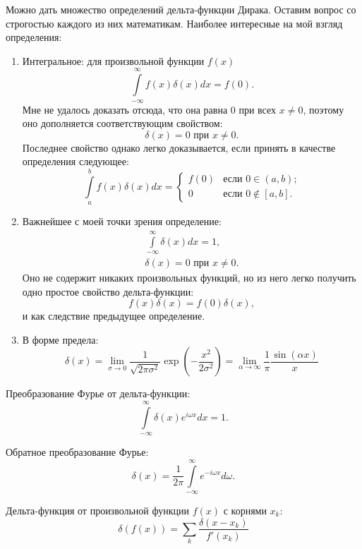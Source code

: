 \documentclass[a4paper,14pt]{extreport} %
\begin{document}
	Можно дать множество определений дельта-функции Дирака. Оставим вопрос со строгостью каждого из них математикам. Наиболее интересные на мой взгляд определения:
	\begin{enumerate}
		\item Интегральное: для произвольной функции $f(x)$
		\[
			\int\limits_{-\infty}^{\infty} f(x) \delta(x) dx = f(0).
		\]
		Мне не удалось доказать отсюда, что она равна 0 при всех $x \ne 0$, поэтому оно дополняется соответствующим свойством:
		\[
			\delta(x) = 0 \text{ при } x\ne 0. 
		\]
		Последнее свойство однако легко доказывается, если принять в качестве определения следующее:
		\[
			\int\limits_{a}^{b} f(x) \delta(x) dx =
			\begin{cases}
			f(0) & \text{если $0\in (a, b)$;}\\
			0 & \text{если $0\notin [a, b]$.}
			\end{cases} 
		\]
		\item Важнейшее с моей точки зрения определение:
		\begin{gather*}
			\int\limits_{-\infty}^{\infty} \delta(x) dx = 1, \\
			\delta(x) = 0 \text{ при } x\ne 0.
		\end{gather*}
		Оно не содержит никаких произвольных функций, но из него легко получить одно простое свойство дельта-функции:
		\[
			f(x)  \delta(x) = f(0) \delta(x),
		\]
		и как следствие предыдущее определение.
		\item В форме предела:
		\[
			\delta(x) = 
			\lim\limits_{\sigma \to 0} \frac{1}{\sqrt{2 \pi \sigma^2}} \exp \left(-\frac{x^2}{2\sigma^2}\right)  =
			\lim\limits_{\alpha \to \infty} \frac{1}{\pi} \frac{\sin (\alpha x)}{x}
		\]
	\end{enumerate}
	
	Преобразование Фурье от дельта-функции:
	\begin{equation*}
		\int\limits_{-\infty}^{\infty} \delta(x) e^{i\omega x} dx = 1.
	\end{equation*}
	
	Обратное преобразование Фурье:
	\begin{equation*}
		\delta (x) = \frac{1}{2\pi} \int\limits_{-\infty}^{\infty} e^{-i \omega x} d \omega.
	\end{equation*}
	
	Дельта-функция от произвольной функции $f(x)$ с корнями $x_k$:
	\begin{equation*}
		\delta (f(x)) = \sum\limits_k  \frac{\delta(x - x_k)}{f'(x_k)}
	\end{equation*}
	
\end{document}
